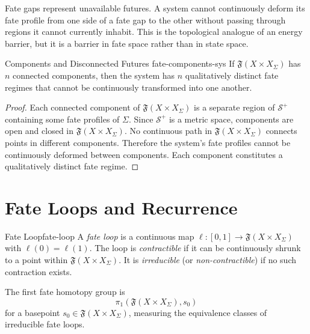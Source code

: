 \documentclass[12pt,twoside,openright]{book}
\newcommand{\distPairs}{X\times X}
\newcommand{\fateMap}{\mathfrak{F}}
\newcommand{\fateSpace}{\mathcal{S}}
\providecommand{\fatePos}{\fateSpace^{+}}
\providecommand{\fateImage}[1]{\fateMap(#1)}
\begin{document}
Fate gaps represent unavailable futures. A system cannot
continuously deform its fate profile from one side of a fate
gap to the other without passing through regions it cannot
currently inhabit. This is the topological analogue of an
energy barrier, but it is a barrier in fate space rather than
in state space.

\begin{proposition}{Components and Disconnected Futures}%
  {fate-components-sys}
If $\fateImage{\distPairs_\Sigma}$ has $n$ connected components,
then the system has $n$ qualitatively distinct fate regimes that
cannot be continuously transformed into one another.
\begin{proof}
Each connected component of $\fateImage{\distPairs_\Sigma}$
is a separate region of $\fatePos$ containing some fate
profiles of $\Sigma$. Since $\fatePos$ is a metric space,
components are open and closed in $\fateImage{\distPairs_\Sigma}$.
No continuous path in $\fateImage{\distPairs_\Sigma}$ connects
points in different components. Therefore the system's fate
profiles cannot be continuously deformed between components.
Each component constitutes a qualitatively distinct fate regime.
\end{proof}
\end{proposition}

\section{Fate Loops and Recurrence}

\begin{definition}{Fate Loop}{fate-loop}
A \emph{fate loop} is a continuous map
$\ell:[0,1]\to\fateImage{\distPairs_\Sigma}$ with
$\ell(0)=\ell(1)$. The loop is \emph{contractible} if it can
be continuously shrunk to a point within
$\fateImage{\distPairs_\Sigma}$. It is \emph{irreducible} (or
\emph{non-contractible}) if no such contraction exists.

The first fate homotopy group is
\[
  \pi_1(\fateImage{\distPairs_\Sigma}, s_0)
\]
for a basepoint $s_0\in\fateImage{\distPairs_\Sigma}$,
measuring the equivalence classes of irreducible fate loops.
\end{definition}
\end{document}
